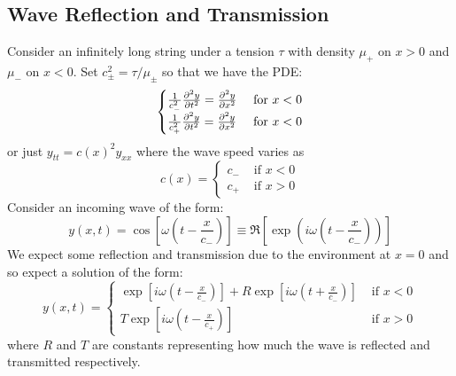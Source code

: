 \documentclass[../main.tex]{subfiles}
\begin{document}
\subsection{Wave Reflection and Transmission}
Consider an infinitely long string under a tension $\tau$ with density $\mu_{+}$ on $x > 0$ and $\mu_{-}$ on $x < 0$.
Set $c^2_{\pm} = \tau/\mu_{\pm}$ so that we have the PDE:
\[
  \begin{cases}
  \frac{1}{c^2_{-}} \pderiv[2]{y}{t} = \pderiv[2]{y}{x} & \text{ for } x < 0 \\
  \frac{1}{c^2_{+}} \pderiv[2]{y}{t} = \pderiv[2]{y}{x} & \text{ for } x < 0 \\
  \end{cases}
\]
or just $y_{t t} = c(x)^2 y_{x x}$ where the wave speed varies as
\[
  c(x) = \begin{cases}
  c_{-} & \text{ if } x < 0 \\
  c_{+} & \text{ if } x> 0
  \end{cases}
\]
Consider an incoming wave of the form:
\[
  y(x, t) = \cos\left[\omega\left(t - \frac{x}{c_{-}}\right)\right] \equiv \Re\left[\exp\left(i\omega\left(t - \frac{x}{c_{-}}\right)\right)\right]
\]
We expect some reflection and transmission due to the environment at $x = 0$ and so expect a solution of the form:
\[
  y(x, t) = \begin{cases}
  \exp\left[i\omega\left(t - \frac{x}{c_{-}}\right)\right] + R \exp\left[i\omega\left(t + \frac{x}{c_{-}}\right)\right] & \text{ if } x < 0 \\
  T \exp\left[i\omega\left(t - \frac{x}{c_{+}}\right)\right] & \text{ if } x > 0
  \end{cases}
\]
where $R$ and $T$ are constants representing how much the wave is reflected and transmitted respectively.
\end{document}
